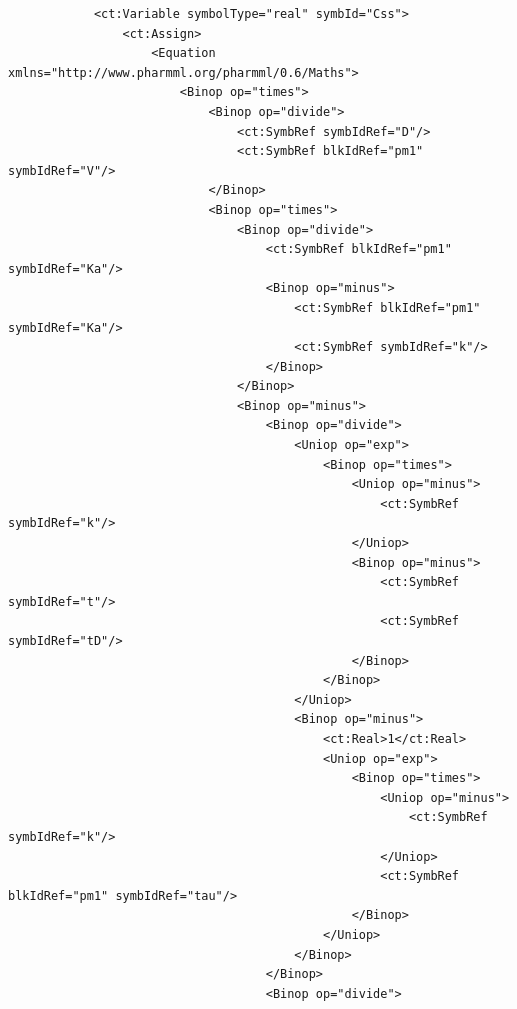 \begin{lstlisting}
            <ct:Variable symbolType="real" symbId="Css">
                <ct:Assign>
                    <Equation xmlns="http://www.pharmml.org/pharmml/0.6/Maths">
                        <Binop op="times">
                            <Binop op="divide">
                                <ct:SymbRef symbIdRef="D"/>
                                <ct:SymbRef blkIdRef="pm1" symbIdRef="V"/>
                            </Binop>
                            <Binop op="times">
                                <Binop op="divide">
                                    <ct:SymbRef blkIdRef="pm1" symbIdRef="Ka"/>
                                    <Binop op="minus">
                                        <ct:SymbRef blkIdRef="pm1" symbIdRef="Ka"/>
                                        <ct:SymbRef symbIdRef="k"/>
                                    </Binop>
                                </Binop>
                                <Binop op="minus">
                                    <Binop op="divide">
                                        <Uniop op="exp">
                                            <Binop op="times">
                                                <Uniop op="minus">
                                                    <ct:SymbRef symbIdRef="k"/>
                                                </Uniop>
                                                <Binop op="minus">
                                                    <ct:SymbRef symbIdRef="t"/>
                                                    <ct:SymbRef symbIdRef="tD"/>                                                    
                                                </Binop>
                                            </Binop>
                                        </Uniop>
                                        <Binop op="minus">
                                            <ct:Real>1</ct:Real>
                                            <Uniop op="exp">
                                                <Binop op="times">
                                                    <Uniop op="minus">
                                                        <ct:SymbRef symbIdRef="k"/>
                                                    </Uniop>
                                                    <ct:SymbRef blkIdRef="pm1" symbIdRef="tau"/>
                                                </Binop>
                                            </Uniop>
                                        </Binop>
                                    </Binop>
                                    <Binop op="divide">

\end{lstlisting}
